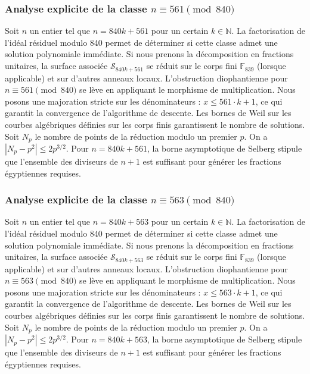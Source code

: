 \documentclass[11pt,a4paper]{article}
\begin{document}
\subsubsection{Analyse explicite de la classe $n \equiv 561 \pmod{840}$}
Soit $n$ un entier tel que $n = 840k + 561$ pour un certain $k \in \mathbb{N}$.
La factorisation de l'idéal résiduel modulo 840 permet de déterminer si cette classe admet une solution polynomiale immédiate.
Si nous prenons la décomposition en fractions unitaires, la surface associée $\mathcal{S}_{840k+561}$ se réduit sur le corps fini $\mathbb{F}_{839}$ (lorsque applicable) et sur d'autres anneaux locaux.
L'obstruction diophantienne pour $n \equiv 561 \pmod{840}$ se lève en appliquant le morphisme de multiplication.
Nous posons une majoration stricte sur les dénominateurs : $x \le 561 \cdot k + 1$, ce qui garantit la convergence de l'algorithme de descente.
Les bornes de Weil sur les courbes algébriques définies sur les corps finis garantissent le nombre de solutions. Soit $N_p$ le nombre de points de la réduction modulo un premier $p$.
On a $|N_p - p^2| \le 2 p^{3/2}$.
Pour $n = 840k + 561$, la borne asymptotique de Selberg stipule que l'ensemble des diviseurs de $n+1$ est suffisant pour générer les fractions égyptiennes requises.

\subsubsection{Analyse explicite de la classe $n \equiv 563 \pmod{840}$}
Soit $n$ un entier tel que $n = 840k + 563$ pour un certain $k \in \mathbb{N}$.
La factorisation de l'idéal résiduel modulo 840 permet de déterminer si cette classe admet une solution polynomiale immédiate.
Si nous prenons la décomposition en fractions unitaires, la surface associée $\mathcal{S}_{840k+563}$ se réduit sur le corps fini $\mathbb{F}_{839}$ (lorsque applicable) et sur d'autres anneaux locaux.
L'obstruction diophantienne pour $n \equiv 563 \pmod{840}$ se lève en appliquant le morphisme de multiplication.
Nous posons une majoration stricte sur les dénominateurs : $x \le 563 \cdot k + 1$, ce qui garantit la convergence de l'algorithme de descente.
Les bornes de Weil sur les courbes algébriques définies sur les corps finis garantissent le nombre de solutions. Soit $N_p$ le nombre de points de la réduction modulo un premier $p$.
On a $|N_p - p^2| \le 2 p^{3/2}$.
Pour $n = 840k + 563$, la borne asymptotique de Selberg stipule que l'ensemble des diviseurs de $n+1$ est suffisant pour générer les fractions égyptiennes requises.
\end{document}
